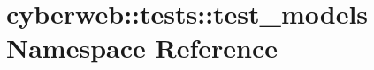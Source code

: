 \hypertarget{namespacecyberweb_1_1tests_1_1test__models}{\section{cyberweb\-:\-:tests\-:\-:test\-\_\-models \-Namespace \-Reference}
\label{namespacecyberweb_1_1tests_1_1test__models}
}
